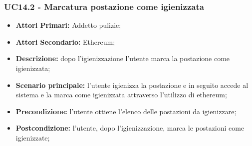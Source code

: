 \subsubsection{UC14.2 - Marcatura postazione come igienizzata}
\begin{itemize}
           	\item\textbf{Attori Primari:} Addetto pulizie;
		\item\textbf{Attori Secondario:} Ethereum;
           	\item\textbf{Descrizione:} dopo l'igienizzazione l'utente marca la postazione come igienizzata;
           	\item\textbf{Scenario principale:} l'utente igienizza la postazione e in seguito accede al sistema e la marca come igienizzata attraverso l'utilizzo di ethereum;
           	\item\textbf{Precondizione:} l'utente ottiene l'elenco delle postazioni da igienizzare;
           	\item\textbf{Postcondizione:} l'utente, dopo l'igienizzazione, marca le postazioni come igienizzate;
\end{itemize}
